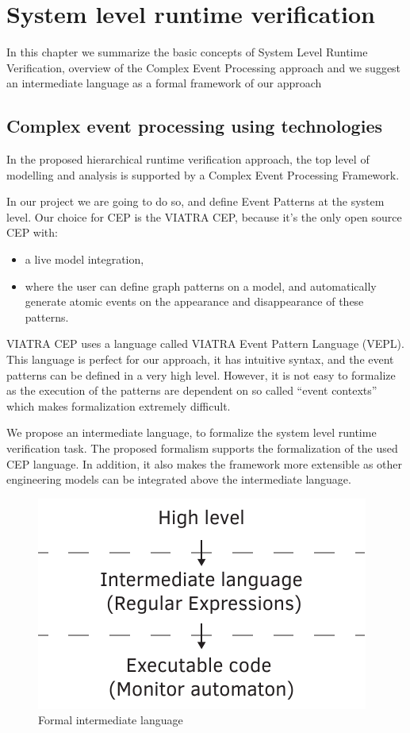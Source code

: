\chapter{System level runtime verification}
	\label{chap:cep}
		In this chapter we summarize the basic concepts of System Level Runtime Verification,
		overview of the Complex Event Processing approach and we suggest an intermediate language as a formal framework of our approach
	
	\section{Complex event processing using technologies}
	
	
	
		In the proposed hierarchical runtime verification approach, the top level of modelling and analysis is supported by a Complex Event Processing Framework.
		
		In our project we are going to do so, and define Event Patterns at the system level.
		Our choice for CEP is the VIATRA CEP, because it's the only open source CEP with:
		\begin{itemize}
			\item a live model integration, 
			\item where the user can define graph patterns on a model, and automatically generate atomic events on the appearance and disappearance of these patterns.
		\end{itemize}
		
		
		VIATRA CEP uses a language called VIATRA Event Pattern Language (VEPL).
		This language is perfect for our approach, it has intuitive syntax, and the event patterns can be defined in
		a very high level. However, it is not easy to formalize as the
		execution of the patterns are dependent on so called ``event contexts'' which makes formalization extremely difficult.
		
		We propose an intermediate language, to formalize the system level runtime verification task.
		The proposed formalism supports the formalization of the used CEP language.
		In addition, it also makes the framework more extensible as other engineering models can be integrated above the intermediate language.
		
		\begin{figure}[h]
		\centering
		\includegraphics[width=0.7\linewidth]{include/figures/chapter_5/sandwich}
		\caption{Formal intermediate language}
		\label{fig:cep:sandwich}
		\end{figure}

